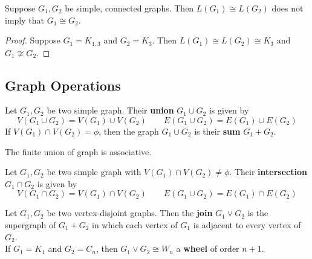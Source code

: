 \begin{remark}
	Suppose $G_1,G_2$ be simple, connected graphs. Then $L(G_1) \cong L(G_2)$ does not imply that $G_1 \cong G_2$.
\end{remark}
\begin{proof}
	Suppose $G_1 = K_{1,3}$ and $G_2 = K_3$. Then $L(G_1) \cong L(G_2) \cong K_3$ and $G_1 \not\cong G_2$.
\end{proof}

\subsection{Graph Operations}
\begin{definition}
	Let $G_1,G_2$ be two simple graph.
	Their \textbf{union} $G_1 \cup G_2$ is given by 
	$$ V(G_1 \cup G_2) = V(G_1) \cup V(G_2) \qquad E(G_1 \cup G_2) = E(G_1) \cup E(G_2) $$
	If $V(G_1) \cap V(G_2) = \phi$, then the graph $G_1 \cup G_2$ is their \textbf{sum} $G_1 + G_2$.
\end{definition}

\begin{remark}
	The finite union of graph is associative.
\end{remark}

\begin{definition}
	Let $G_1,G_2$ be two simple graph with $V(G_1) \cap V(G_2) \ne \phi$.
	Their \textbf{intersection} $G_1 \cap G_2$ is given by 
	$$ V(G_1 \cap G_2) = V(G_1) \cap V(G_2) \qquad E(G_1 \cup G_2) = E(G_1) \cap E(G_2) $$
\end{definition}

\begin{definition}
	Let $G_1,G_2$ be two vertex-disjoint graphs. Then the \textbf{join} $G_1 \vee G_2$ is the supergraph of $G_1 + G_2$ in which each vertex of $G_1$ is adjacent to every vertex of $G_2$.\\

	If $G_1 = K_1$ and $G_2 = C_n$, then $G_1 \vee G_2 \cong W_n$ a \textbf{wheel} of order $n+1$.
\end{definition}

